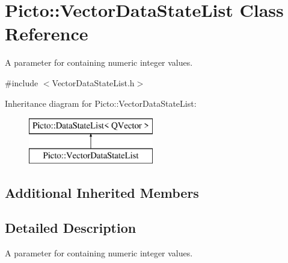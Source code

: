 \hypertarget{class_picto_1_1_vector_data_state_list}{\section{Picto\-:\-:Vector\-Data\-State\-List Class Reference}
\label{class_picto_1_1_vector_data_state_list}
}


A parameter for containing numeric integer values.  




{\ttfamily \#include $<$Vector\-Data\-State\-List.\-h$>$}

Inheritance diagram for Picto\-:\-:Vector\-Data\-State\-List\-:\begin{figure}[H]
\begin{center}
\leavevmode
\includegraphics[height=2.000000cm]{class_picto_1_1_vector_data_state_list}
\end{center}
\end{figure}
\subsection*{Additional Inherited Members}


\subsection{Detailed Description}
A parameter for containing numeric integer values. 

